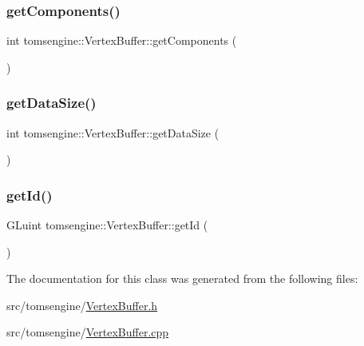 \mbox{\label{classtomsengine_1_1_vertex_buffer_a8c14b28f3a7e8be817fe96fee3eff267}} 
\subsubsection{\texorpdfstring{get\+Components()}{getComponents()}}
{\footnotesize\ttfamily int tomsengine\+::\+Vertex\+Buffer\+::get\+Components (\begin{DoxyParamCaption}{ }\end{DoxyParamCaption})}

\mbox{\label{classtomsengine_1_1_vertex_buffer_ae8896eeaab9d4602d4d4f7db3d583d87}} 
\subsubsection{\texorpdfstring{get\+Data\+Size()}{getDataSize()}}
{\footnotesize\ttfamily int tomsengine\+::\+Vertex\+Buffer\+::get\+Data\+Size (\begin{DoxyParamCaption}{ }\end{DoxyParamCaption})}

\mbox{\label{classtomsengine_1_1_vertex_buffer_a2a50925ab34c9084ccb164188fcf35b2}} 
\subsubsection{\texorpdfstring{get\+Id()}{getId()}}
{\footnotesize\ttfamily G\+Luint tomsengine\+::\+Vertex\+Buffer\+::get\+Id (\begin{DoxyParamCaption}{ }\end{DoxyParamCaption})}



The documentation for this class was generated from the following files\+:\begin{DoxyCompactItemize}
\item 
src/tomsengine/\mbox{\hyperlink{_vertex_buffer_8h}{Vertex\+Buffer.\+h}}\item 
src/tomsengine/\mbox{\hyperlink{_vertex_buffer_8cpp}{Vertex\+Buffer.\+cpp}}\end{DoxyCompactItemize}
